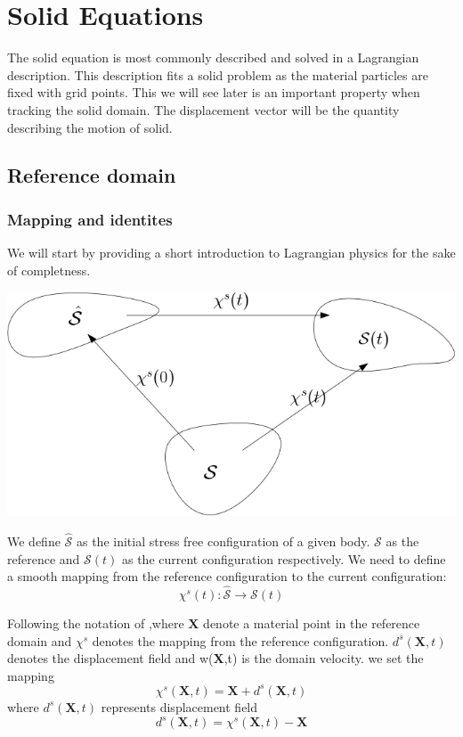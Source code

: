 \chapter*{Solid Equations}
The solid equation is most commonly described and solved in a Lagrangian description. This description fits a solid problem as the material particles are fixed with grid points. This we will see later is an important property when tracking the solid domain. The displacement vector will be the quantity describing the motion of solid.
\section*{Reference domain}
\subsection*{Mapping and identites}
We will start by providing a short introduction to Lagrangian physics for the sake of completness.
\begin{center}
\includegraphics[scale=0.4]{continuum_mapping.png}
\end{center}
We define $ \hat{\mathcal{S}}$ as the initial stress free configuration of a given body. $\mathcal{S}$ as the reference and $\mathcal{S}(t)$ as the current configuration respectively.
We need to define a smooth mapping from the reference configuration to the current configuration:
$$  \chi^s(t) : \hat{\mathcal{S}} \rightarrow \mathcal{S}(t)     $$ 

Following the notation of \cite{Holzapfel2000},where $\textbf{X}$ denote a material point in the reference domain and $\chi^s$ denotes the mapping from the reference configuration. 
$d^s(\textbf{X},t)$ denotes the displacement field and w(\textbf{X},t) is the domain velocity. we set the mapping
$$\chi^s(\textbf{X},t) = \textbf{X}  + d^s(\textbf{X} ,t)$$
where $d^s(\textbf{X} ,t)$ represents displacement field
$$  d^s(\textbf{X},t) = \chi^s(\textbf{X},t) -\textbf{X}   $$

